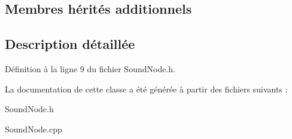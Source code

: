 \subsection*{Membres hérités additionnels}


\subsection{Description détaillée}


Définition à la ligne 9 du fichier Sound\+Node.\+h.



La documentation de cette classe a été générée à partir des fichiers suivants \+:\begin{DoxyCompactItemize}
\item 
Sound\+Node.\+h\item 
Sound\+Node.\+cpp\end{DoxyCompactItemize}
